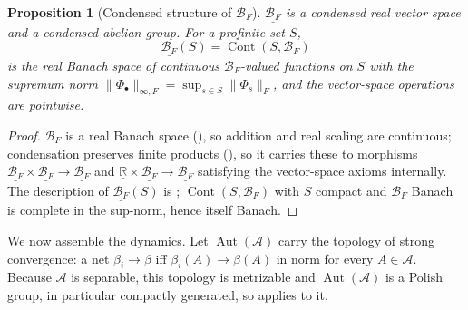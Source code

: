 \documentclass[12pt]{article}
\newcommand{\cond}[1]{\underline{#1}}          %
\newcommand{\Cont}{\operatorname{Cont}}        %
\newcommand{\Ffun}{F}                          %
\newcommand{\BF}{\mathcal{B}_{F}}              %
\newcommand{\qA}{\mathcal{A}}
\newcommand{\Aut}{\operatorname{Aut}}
\newcommand{\norm}[1]{\lVert #1\rVert}
\newcommand{\Fnorm}[1]{\lVert #1\rVert_{F}}
\newcommand{\R}{\mathbb{R}}
\newtheorem{proposition}[theorem]{Proposition}
\theoremstyle{definition}
\theoremstyle{remark}
\begin{document}
\begin{proposition}[Condensed structure of $\BF$]
\label{prop:condensed-BF}
$\cond{\BF}$ is a condensed real vector space and a condensed abelian group. For a profinite
set $S$,
\[
  \cond{\BF}(S)=\Cont(S,\BF)
\]
is the real Banach space of continuous $\BF$-valued functions on $S$ with the supremum norm
$\norm{\Phi_\bullet}_{\infty,\Ffun}=\sup_{s\in S}\Fnorm{\Phi_s}$, and the vector-space
operations are pointwise.
\end{proposition}
\begin{proof}
$\BF$ is a real Banach space (), so addition and real scaling are
continuous; condensation preserves finite products (), so it carries
these to morphisms $\cond{\BF}\times\cond{\BF}\to\cond{\BF}$ and
$\cond{\R}\times\cond{\BF}\to\cond{\BF}$ satisfying the vector-space axioms internally. The
description of $\cond{\BF}(S)$ is ; $\Cont(S,\BF)$ with $S$ compact and
$\BF$ Banach is complete in the sup-norm, hence itself Banach.
\end{proof}

We now assemble the dynamics. Let $\Aut(\qA)$ carry the topology of strong convergence: a net
$\beta_i\to\beta$ iff $\beta_i(A)\to\beta(A)$ in norm for every $A\in\qA$. Because $\qA$ is
separable, this topology is metrizable and $\Aut(\qA)$ is a Polish group, in particular
compactly generated, so  applies to it.
\end{document}

